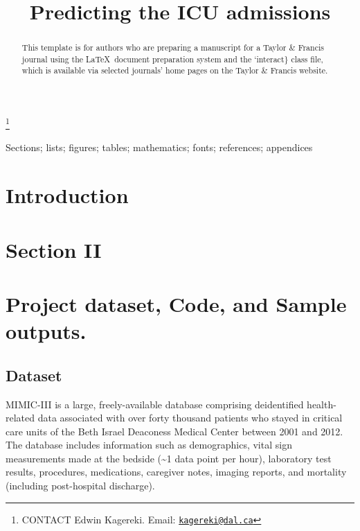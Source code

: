 \documentclass[]{interact}
\theoremstyle{plain}%
\theoremstyle{definition}
\theoremstyle{remark}
\begin{document}

\title{Predicting the ICU admissions}


\author{
}

\thanks{CONTACT Edwin
Kagereki. Email: \href{mailto:kagereki@dal.ca}{\nolinkurl{kagereki@dal.ca}}}

\maketitle

\begin{abstract}
This template is for authors who are preparing a manuscript for a Taylor
\& Francis journal using the \LaTeX~document preparation system and the
`interact\} class file, which is available via selected journals' home
pages on the Taylor \& Francis website.
\end{abstract}

\begin{keywords}
Sections; lists; figures; tables; mathematics; fonts; references;
appendices
\end{keywords}

\hypertarget{introduction}{%
\section{Introduction}\label{introduction}}

\hypertarget{section-ii}{%
\section{Section II}\label{section-ii}}

\hypertarget{project-dataset-code-and-sample-outputs.}{%
\section{Project dataset, Code, and Sample
outputs.}\label{project-dataset-code-and-sample-outputs.}}

\hypertarget{dataset}{%
\subsection{Dataset}\label{dataset}}

MIMIC-III is a large, freely-available database comprising deidentified
health-related data associated with over forty thousand patients who
stayed in critical care units of the Beth Israel Deaconess Medical
Center between 2001 and 2012. The database includes information such as
demographics, vital sign measurements made at the bedside
(\textasciitilde1 data point per hour), laboratory test results,
procedures, medications, caregiver notes, imaging reports, and mortality
(including post-hospital discharge).
\end{document}
